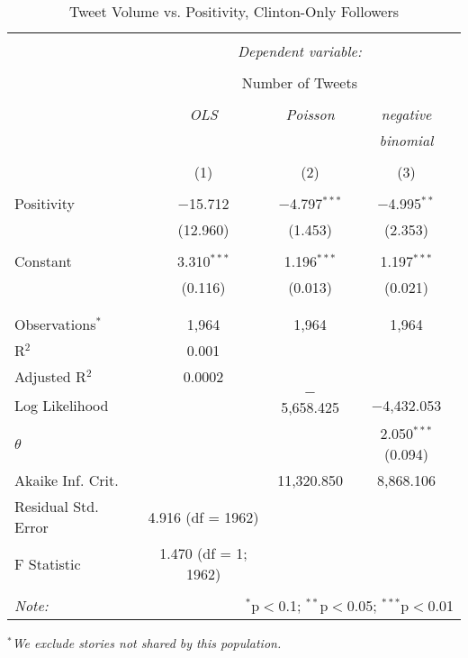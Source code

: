 \begin{table}[!htbp] \centering 
  \caption{Tweet Volume vs. Positivity, Clinton-Only Followers} 
  \label{} 
    \begin{tabular}{@{\extracolsep{5pt}}lccc} 
    \\[-1.8ex]\hline 
    \hline \\[-1.8ex] 
     & \multicolumn{3}{c}{\textit{Dependent variable:}} \\ 
    \cline{2-4} 
    \\[-1.8ex] & \multicolumn{3}{c}{Number of Tweets} \\ 
    \\[-1.8ex] & \textit{OLS} & \textit{Poisson} & \textit{negative} \\ 
     & \textit{} & \textit{} & \textit{binomial} \\ 
    \\[-1.8ex] & (1) & (2) & (3)\\ 
    \hline \\[-1.8ex] 
     Positivity & $-$15.712 & $-$4.797$^{***}$ & $-$4.995$^{**}$ \\ 
      & (12.960) & (1.453) & (2.353) \\ 
      & & & \\ 
     Constant & 3.310$^{***}$ & 1.196$^{***}$ & 1.197$^{***}$ \\ 
      & (0.116) & (0.013) & (0.021) \\ 
      & & & \\ 
    \hline \\[-1.8ex] 
    Observations$^{*}$ & 1,964 & 1,964 & 1,964 \\ 
    R$^{2}$ & 0.001 &  &  \\ 
    Adjusted R$^{2}$ & 0.0002 &  &  \\ 
    Log Likelihood &  & $-$5,658.425 & $-$4,432.053 \\ 
    $\theta$ &  &  & 2.050$^{***}$  (0.094) \\ 
    Akaike Inf. Crit. &  & 11,320.850 & 8,868.106 \\ 
    Residual Std. Error & 4.916 (df = 1962) &  &  \\ 
    F Statistic & 1.470 (df = 1; 1962) &  &  \\ 
    \hline 
    \hline \\[-1.8ex] 
    \textit{Note:}  & \multicolumn{3}{r}{$^{*}$p$<$0.1; $^{**}$p$<$0.05; $^{***}$p$<$0.01} \\ 
    \end{tabular} 
\end{table} 
\emph{$^{*}$We exclude stories not shared by this population.} 
\newpage 

